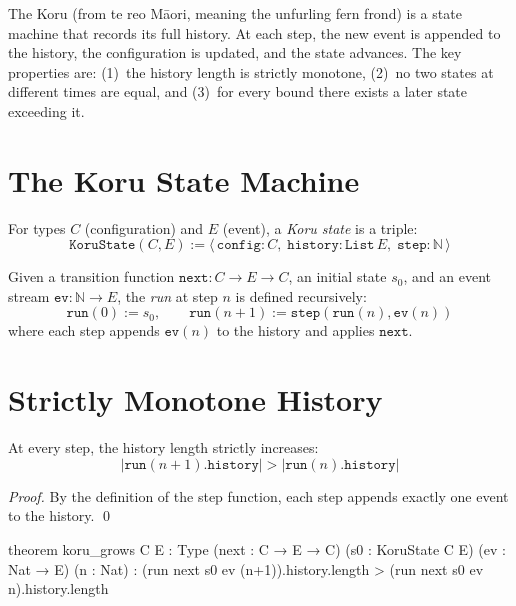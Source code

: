 The Koru (from te reo M\={a}ori, meaning the unfurling fern frond) is a state machine that records its full history. At each step, the new event is appended to the history, the configuration is updated, and the state advances. The key properties are: (1)~the history length is strictly monotone, (2)~no two states at different times are equal, and (3)~for every bound there exists a later state exceeding it.

\section{The Koru State Machine}

\begin{definition}\label{def:koru-state}
For types $C$ (configuration) and $E$ (event), a \emph{Koru state} is a triple:
\[
\texttt{KoruState}(C, E) := \langle\, \texttt{config} : C,\; \texttt{history} : \texttt{List}\, E,\; \texttt{step} : \mathbb{N}\,\rangle
\]
\end{definition}

\begin{definition}\label{def:koru-run}
Given a transition function $\texttt{next} : C \to E \to C$, an initial state $s_0$, and an event stream $\texttt{ev} : \mathbb{N} \to E$, the \emph{run} at step $n$ is defined recursively:
\[
\texttt{run}(0) := s_0, \qquad \texttt{run}(n{+}1) := \texttt{step}(\texttt{run}(n), \texttt{ev}(n))
\]
where each step appends $\texttt{ev}(n)$ to the history and applies $\texttt{next}$.
\end{definition}

\section{Strictly Monotone History}

\begin{theorem}\label{thm:grows}
At every step, the history length strictly increases:
\[
|\texttt{run}(n{+}1).\texttt{history}| > |\texttt{run}(n).\texttt{history}|
\]
\end{theorem}

\begin{proof}
By the definition of the step function, each step appends exactly one event to the history. \qed
\end{proof}

\begin{leancode}
theorem koru_grows {C E : Type} (next : C → E → C)
    (s0 : KoruState C E) (ev : Nat → E) (n : Nat) :
    (run next s0 ev (n+1)).history.length >
    (run next s0 ev n).history.length
\end{leancode}

